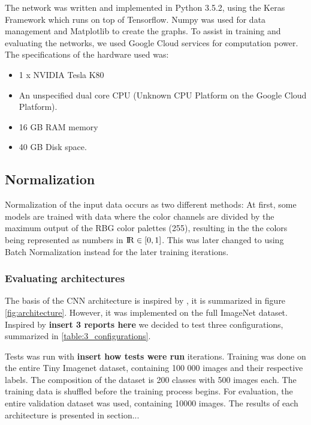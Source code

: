 \documentclass{kthreport}
\begin{document}
The network was written and implemented in Python 3.5.2, using the Keras Framework which runs on top of Tensorflow. Numpy was used for data management and Matplotlib to create the graphs. To assist in training and evaluating the networks, we used Google Cloud services for computation power. The specifications of the hardware used was:
\begin{itemize}
\item 1 x NVIDIA Tesla K80
\item An unspecified dual core CPU (Unknown CPU Platform on the Google Cloud Platform).
\item 16 GB RAM memory
\item 40 GB Disk space.
\end{itemize}

\subsection{Normalization}
Normalization of the input data occurs as two different methods: At first, some models are trained with data where the color channels are divided by the maximum output of the RBG color palettes (255), resulting in the the colors being represented as numbers in ${\rm I\!R} \in [0,1]$.
This was later changed to using Batch Normalization instead for the later training iterations.

\subsubsection{Evaluating architectures}

The basis of the CNN architecture is inspired by \cite{NIPS2012_4824}, it is summarized in figure \ref{fig:architecture}. However, it was implemented on the full ImageNet dataset. Inspired by \textbf{insert 3 reports here} we decided to test three configurations, summarized in \ref{table:3_configurations}.


\FloatBarrier


\FloatBarrier


Tests was run with \textbf{insert how tests were run} iterations. Training was done on the entire Tiny Imagenet dataset, containing 100 000 images and their respective labels. The composition of the dataset is 200 classes with 500 images each. The training data is shuffled before the training process begins. For evaluation, the entire validation dataset was used, containing 10000 images. The results of each architecture is presented in section...
\end{document}
